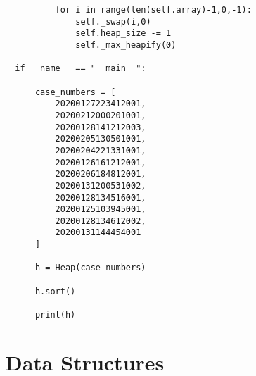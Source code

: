 \documentclass[11pt]{article}
\begin{document}
\begin{verbatim}
          for i in range(len(self.array)-1,0,-1):
              self._swap(i,0)
              self.heap_size -= 1
              self._max_heapify(0)

  if __name__ == "__main__":

      case_numbers = [
          20200127223412001,
          20200212000201001,
          20200128141212003,
          20200205130501001,
          20200204221331001,
          20200126161212001,
          20200206184812001,
          20200131200531002,
          20200128134516001,
          20200125103945001,
          20200128134612002,
          20200131144454001
      ]

      h = Heap(case_numbers)

      h.sort()

      print(h)
\end{verbatim}


\section{Data Structures}
\label{sec:org8f4f571}
\end{document}
